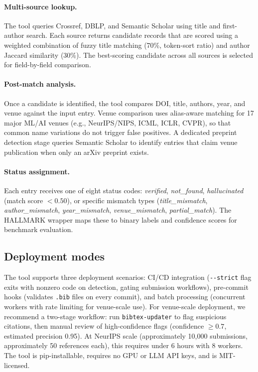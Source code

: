 \paragraph{Multi-source lookup.}
The tool queries Crossref, DBLP, and Semantic Scholar using title and first-author search. Each source returns candidate records that are scored using a weighted combination of fuzzy title matching (70\%, token-sort ratio) and author Jaccard similarity (30\%). The best-scoring candidate across all sources is selected for field-by-field comparison.

\paragraph{Post-match analysis.}
Once a candidate is identified, the tool compares DOI, title, authors, year, and venue against the input entry. Venue comparison uses alias-aware matching for 17 major ML/AI venues (e.g., NeurIPS/NIPS, ICML, ICLR, CVPR), so that common name variations do not trigger false positives. A dedicated preprint detection stage queries Semantic Scholar to identify entries that claim venue publication when only an arXiv preprint exists.

\paragraph{Status assignment.}
Each entry receives one of eight status codes: \emph{verified}, \emph{not\_found}, \emph{hallucinated} (match score $< 0.50$), or specific mismatch types (\emph{title\_mismatch}, \emph{author\_mismatch}, \emph{year\_mismatch}, \emph{venue\_mismatch}, \emph{partial\_match}). The HALLMARK wrapper maps these to binary labels and confidence scores for benchmark evaluation.

\subsection{Deployment modes}
\label{sec:deployment}

The tool supports three deployment scenarios: CI/CD integration (\texttt{-{}-strict} flag exits with nonzero code on detection, gating submission workflows), pre-commit hooks (validates \texttt{.bib} files on every commit), and batch processing (concurrent workers with rate limiting for venue-scale use).
For venue-scale deployment, we recommend a two-stage workflow: run \texttt{bibtex-updater} to flag suspicious citations, then manual review of high-confidence flags (confidence $\geq 0.7$, estimated precision 0.95).
At NeurIPS scale (approximately 10,000 submissions, approximately 50 references each), this requires under 6 hours with 8 workers.
The tool is pip-installable, requires no GPU or LLM API keys, and is MIT-licensed.
